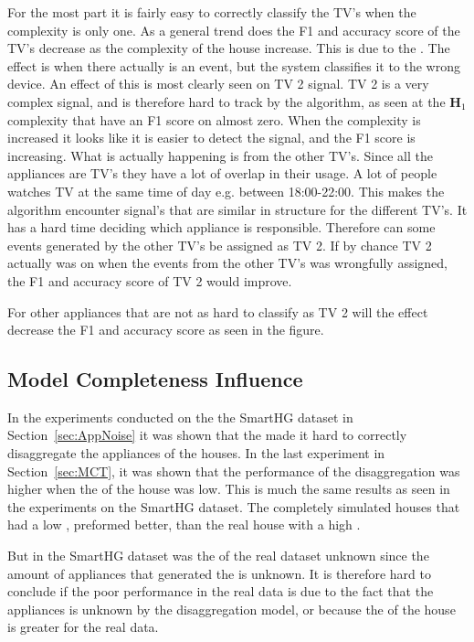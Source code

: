For the most part it is fairly easy to correctly classify the TV's when the complexity is only one. As a general trend does the F1 and accuracy score of the TV's decrease as the complexity of the house increase. This is due to the . The  effect is when there actually is an event, but the system classifies it to the wrong device.  An effect of this is most clearly seen on TV 2 signal. TV 2 is a very complex signal, and is therefore hard to track by the algorithm, as seen at the $\textbf{H}_1$ complexity that have an F1 score on almost zero. When the complexity is increased it looks like it is easier to detect the signal, and the F1 score is increasing. What is actually happening is  from the other TV's. Since all the appliances are TV's they have a lot of overlap in their usage. A lot of people watches TV at the same time of day e.g. between 18:00-22:00. This makes the algorithm encounter signal's that are similar in structure for the different TV's. It has a hard time deciding which appliance is responsible. Therefore can some events generated by the other TV's be assigned as TV 2. If by chance TV 2 actually was on when the events from the other TV's was wrongfully assigned, the F1 and accuracy score of TV 2 would improve. 

For other appliances that are not as hard to classify as TV 2 will the  effect decrease the F1 and accuracy score as seen in the figure. 

\subsection{Model Completeness Influence }
In the experiments conducted on the the SmartHG dataset in Section~\ref{sec:AppNoise} it was shown that the  made it hard to correctly disaggregate the appliances of the houses. In the last experiment in Section~\ref{sec:MCT}, it was shown that the performance of the disaggregation was higher when the  of the house was low. This is much the same results as seen in the experiments on the SmartHG dataset. The completely simulated houses that had a low , preformed better, than the real house with a high . 

But in the SmartHG dataset was the  of the real dataset unknown since the amount of appliances that generated the  is unknown. It is therefore hard to conclude if the poor performance in the real data is due to the fact that the appliances is unknown by the disaggregation model, or because the  of the house is greater for the real data. 

